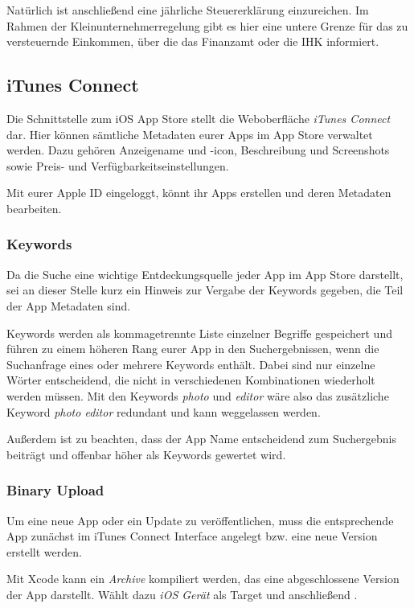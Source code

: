 \documentclass[parskip=half, final]{scrreprt}
\begin{document}
Natürlich ist anschließend eine jährliche Steuererklärung einzureichen. Im Rahmen der Kleinunternehmerregelung gibt es hier eine untere Grenze für das zu versteuernde Einkommen, über die das Finanzamt oder die IHK informiert.

\subsection{iTunes Connect}

Die Schnittstelle zum iOS App Store stellt die Weboberfläche \emph{iTunes Connect } dar. Hier können sämtliche Metadaten eurer Apps im App Store verwaltet werden. Dazu gehören Anzeigename und -icon, Beschreibung und Screenshots sowie Preis- und Verfügbarkeitseinstellungen.

Mit eurer Apple ID eingeloggt, könnt ihr Apps erstellen und deren Metadaten bearbeiten.

\subsubsection{Keywords}

Da die Suche eine wichtige Entdeckungsquelle jeder App im App Store darstellt, sei an dieser Stelle kurz ein Hinweis zur Vergabe der Keywords gegeben, die Teil der App Metadaten sind.

Keywords werden als kommagetrennte Liste einzelner Begriffe gespeichert und führen zu einem höheren Rang eurer App in den Suchergebnissen, wenn die Suchanfrage eines oder mehrere Keywords enthält. Dabei sind nur einzelne Wörter entscheidend, die nicht in verschiedenen Kombinationen wiederholt werden müssen. Mit den Keywords \emph{photo} und \emph{editor} wäre also das zusätzliche Keyword \emph{photo editor} redundant und kann weggelassen werden.

Außerdem ist zu beachten, dass der App Name entscheidend zum Suchergebnis beiträgt und offenbar höher als Keywords gewertet wird.

\subsubsection{Binary Upload}

Um eine neue App oder ein Update zu veröffentlichen, muss die entsprechende App zunächst im iTunes Connect Interface angelegt bzw. eine neue Version erstellt werden.

Mit Xcode kann ein \emph{Archive} kompiliert werden, das eine abgeschlossene Version der App darstellt. Wählt dazu \emph{iOS Gerät} als Target und anschließend .
\end{document}
